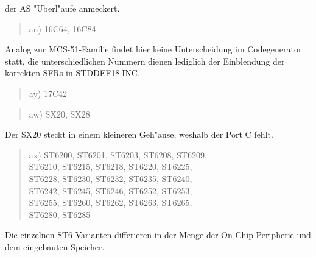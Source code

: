 \documentclass[12pt,a4paper,twoside]{report}
\begin{document}
der AS "Uberl"aufe anmeckert.
\begin{quote}
au) 16C64, 16C84
\end{quote}
Analog zur MCS-51-Familie findet hier keine Unterscheidung im
Codegenerator statt, die unterschiedlichen Nummern dienen lediglich
der Einblendung der korrekten SFRs in STDDEF18.INC.
\begin{quote}
av) 17C42
\end{quote}
\begin{quote}
aw) SX20, SX28
\end{quote}
Der SX20 steckt in einem kleineren Geh"ause, weshalb der Port C
fehlt.
\begin{quote}
ax) ST6200, ST6201, ST6203, ST6208, ST6209,\\
    ST6210, ST6215, ST6218, ST6220, ST6225,\\
    ST6228, ST6230, ST6232, ST6235, ST6240,\\
    ST6242, ST6245, ST6246, ST6252, ST6253,\\
    ST6255, ST6260, ST6262, ST6263, ST6265,\\
    ST6280, ST6285
\end{quote}
Die einzelnen ST6-Varianten differieren in der Menge der
On-Chip-Peripherie und dem eingebauten Speicher.
\end{document}
